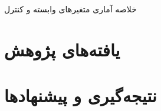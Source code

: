 \documentclass[12pt, a4paper]{article}
\begin{document}
  
  
		\begin{table}[htbp]
  	\centering
  	\caption{خلاصه آماری متغیر‌های وابسته و کنترل}
  	\label{tab:Controlsummary}	
  	\begin{LTR}
  	\resizebox{0.75\textwidth}{!}{
  		
  	}
  \end{LTR}
  	

    \end{table}




  
  
\section{یافته‌های پژوهش}


	




\lr{				\begin{table}[htbp]
	\centering
	\resizebox{0.75\textwidth}{!}{
		
		\label{tab:synchronicityt4}	
	}
\end{table}}



 
\lr{	\begin{table}[htbp]
		\centering
		\resizebox{0.75\textwidth}{!}{
			
			\label{tab:synchronicityt5}	
		}
	\end{table}}



\section{نتیجه‌گیری و پیشنهاد‌ها}

\begin{LTR}		
	
	
\end{LTR}
\end{document}
